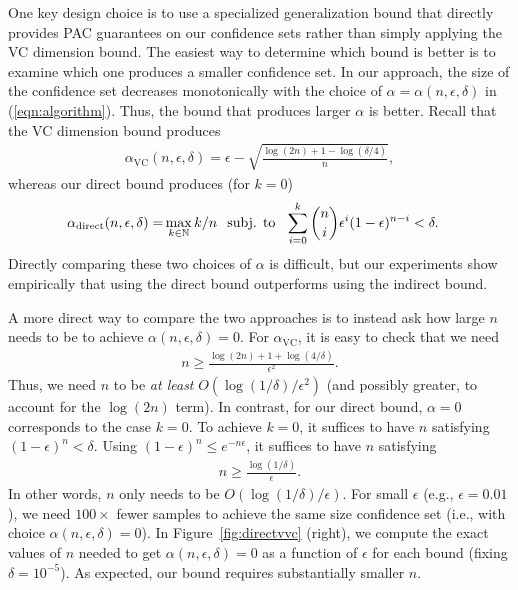 \documentclass{article} \usepackage{iclr2020_conference,times}
\renewcommand{\(}						{\left(}
\renewcommand{\)}						{\right)}
\renewcommand{\[}						{\left[}
\renewcommand{\]}						{\right]}
\newcommand{\<}						{\left<}
\renewcommand{\>}						{\right>}
\begin{document}
One key design choice is to use a specialized generalization bound that directly provides PAC guarantees on our confidence sets rather than simply applying the VC dimension bound. The easiest way to determine which bound is better is to examine which one produces a smaller confidence set. In our approach, the size of the confidence set decreases monotonically with the choice of $\alpha=\alpha(n,\epsilon,\delta)$ in (\ref{eqn:algorithm}). Thus, the bound that produces larger $\alpha$ is better. Recall that the VC dimension bound produces
\begin{align*}
\alpha_{\text{VC}}(n,\epsilon,\delta)=\epsilon-\sqrt{\frac{\log(2n)+1-\log(\delta/4)}{n}},
\end{align*}
whereas our direct bound produces (for $k=0$)
\begin{align*}
\alpha_{\text{direct}}(n,\epsilon,\delta)=&\max_{k\in\mathbb{N}}k/n
\hspace{0.1in}
\text{subj. to}\hspace{0.1in}\sum_{i=0}^k {n \choose i} \epsilon^{i} (1 - \epsilon)^{n-i} < \delta.
\end{align*}
Directly comparing these two choices of $\alpha$ is difficult, but our experiments show empirically that using the direct bound outperforms using the indirect bound.

A more direct way to compare the two approaches is to instead ask how large $n$ needs to be to achieve $\alpha(n,\epsilon,\delta)=0$. For $\alpha_{\text{VC}}$, it is easy to check that we need
\begin{align*}
n\ge\frac{\log(2n)+1+\log(4/\delta)}{\epsilon^2}.
\end{align*}
Thus, we need $n$ to be \emph{at least} $O(\log(1/\delta)/\epsilon^2)$ (and possibly greater, to account for the $\log(2n)$ term). In contrast, for our direct bound, $\alpha=0$ corresponds to the case $k=0$. To achieve $k=0$, it suffices to have $n$ satisfying $(1-\epsilon)^n<\delta$. Using $(1-\epsilon)^n\le e^{-n\epsilon}$, it suffices to have $n$ satisfying
\begin{align*}
n\ge\frac{\log(1/\delta)}{\epsilon}.
\end{align*}
In other words, $n$ only needs to be $O(\log(1/\delta)/\epsilon)$. For small $\epsilon$ (e.g., $\epsilon=0.01$), we need $100\times$ fewer samples to achieve the same size confidence set (i.e., with choice $\alpha(n,\epsilon,\delta)=0$). In Figure~\ref{fig:directvvc} (right), we compute the exact values of $n$ needed to get $\alpha(n,\epsilon,\delta)=0$ as a function of $\epsilon$ for each bound (fixing $\delta=10^{-5}$). As expected, our bound requires substantially smaller $n$.
\end{document}
